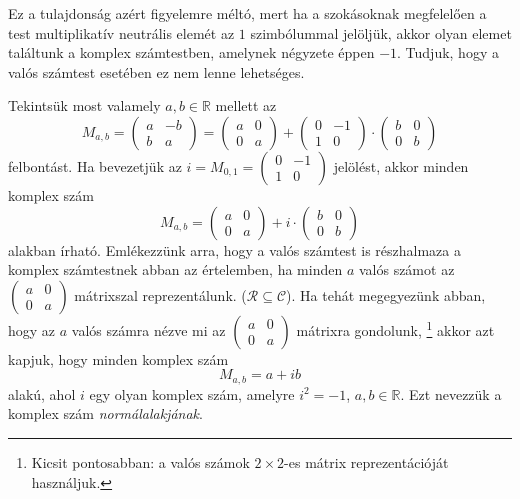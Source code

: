 \documentclass[a4paper, showtrims]{memoir}
\theoremstyle{plain}
\theoremstyle{remark}
\theoremstyle{definition}
\begin{document}
Ez a tulajdonság azért figyelemre méltó,
mert ha a szokásoknak megfelelően a test multiplikatív neutrális elemét az $1$ szimbólummal jelöljük,
akkor olyan elemet találtunk a komplex számtestben,
amelynek négyzete éppen $-1$.
Tudjuk, hogy a valós számtest esetében ez nem lenne lehetséges.

Tekintsük most valamely $a,b\in\mathbb{R}$ mellett az
\[
	M_{a,b}=
	\begin{pmatrix}
		a & -b \\
		b & a
	\end{pmatrix}
	=
	\begin{pmatrix}
		a & 0 \\
		0 & a
	\end{pmatrix}
	+
	\begin{pmatrix}
		0 & -1 \\
		1 & 0
	\end{pmatrix}
	\cdot
	\begin{pmatrix}
		b & 0 \\
		0 & b
	\end{pmatrix}
\]
felbontást.
Ha bevezetjük az
\(
i=M_{0,1}=
\begin{pmatrix}
	0 & -1 \\
	1 & 0
\end{pmatrix}
\)
jelölést, akkor minden komplex szám
\[
	M_{a,b}=
	\begin{pmatrix}
		a & 0 \\
		0 & a
	\end{pmatrix}
	+
	i
	\cdot
	\begin{pmatrix}
		b & 0 \\
		0 & b
	\end{pmatrix}
\]
alakban írható.
Emlékezzünk arra,
hogy a valós számtest is részhalmaza a komplex számtestnek abban az értelemben,
ha minden $a$ valós számot az
\begin{math}
	\begin{pmatrix}
		a & 0 \\
		0 & a
	\end{pmatrix}
\end{math}
mátrixszal reprezentálunk. ($\mathcal{R}\subseteq\mathcal{C}$).
Ha tehát megegyezünk abban, hogy az $a$ valós számra nézve mi az
\(
\begin{pmatrix}
	a & 0 \\
	0 & a
\end{pmatrix}
\)
mátrixra gondolunk,%
\footnote{Kicsit pontosabban: a valós számok $2\times 2$-es mátrix reprezentációját használjuk.}
akkor azt kapjuk, hogy minden komplex szám
\[
	M_{a,b}=a+ib
\]
alakú, ahol $i$ egy olyan komplex szám, amelyre $i^2=-1$, $a,b\in\mathbb{R}$.
Ezt nevezzük a komplex szám \emph{normálalakjának}.
\end{document}

